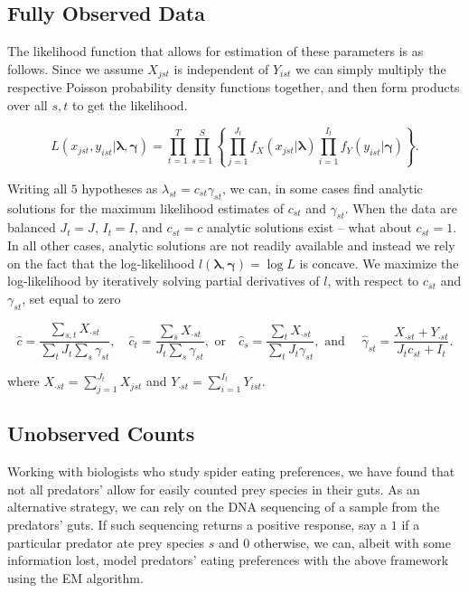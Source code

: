 \subsection{Fully Observed Data}

The likelihood function that allows for estimation of these parameters is as follows.  Since we assume $X_{jst}$ is independent of $Y_{ist}$ we can simply multiply the respective Poisson probability density functions together, and then form products over all $s,t$ to get the likelihood.  

\begin{equation}
  \label{eq:likelihood}
  L(x_{jst}, y_{ist} |\boldsymbol{\lambda}, \boldsymbol{\gamma}) = \prod_{t = 1}^{T} \prod_{s=1}^S \left\{ \prod_{j=1}^{J_t} f_X(x_{jst}|\boldsymbol{\lambda}) \prod_{i=1}^{I_t} f_Y(y_{ist} | \boldsymbol{\gamma}) \right\}.
\end{equation}

\noindent Writing all $5$ hypotheses as $\lambda_{st} = c_{st}\gamma_{st}$, we can, in some cases find analytic solutions for the maximum likelihood estimates of $c_{st}$ and $\gamma_{st}$.  When the data are balanced $J_t = J$, $I_t = I$, and $c_{st} = c$ analytic solutions exist -- {\color{red}what about $c_{st} = 1$}.  In all other cases, analytic solutions are not readily available and instead we rely on the fact that the log-likelihood $l(\boldsymbol{\lambda}, \boldsymbol{\gamma}) = \log{L}$ is concave.  We maximize the log-likelihood by iteratively solving partial derivatives of $l$, with respect to $c_{st}$ and $\gamma_{st}$, set equal to zero

\begin{equation*}
  \hat{c} = \frac{\sum_{s,t} X_{\cdot st}}{\sum_t J_t \sum_s \gamma_{st}}, \quad \hat{c}_t =  \frac{\sum_s X_{\cdot st}}{J_t \sum_s \gamma_{st}}, \text{ or} \quad \hat{c}_s = \frac{\sum_{t}X_{\cdot st}}{\sum_t J_t \gamma_{st}}, \text{ and } \quad \hat{\gamma}_{st} = \frac{X_{\cdot st} + Y_{\cdot st}}{J_t c_{st} + I_t}.
\end{equation*}

\noindent where $X_{\cdot st} = \sum_{j=1}^{J_t}X_{jst}$ and $Y_{\cdot st} = \sum_{i=1}^{I_t} Y_{ist}$.


\subsection{Unobserved Counts}

Working with biologists who study spider eating preferences, we have found that not all predators' allow for easily counted prey species in their guts.  As an alternative strategy, we can rely on the DNA sequencing of a sample from the predators' guts.  If such sequencing returns a positive response, say a $1$ if a particular predator ate prey species $s$ and $0$ otherwise, we can, albeit with some information lost, model predators' eating preferences with the above framework using the EM algorithm.  

